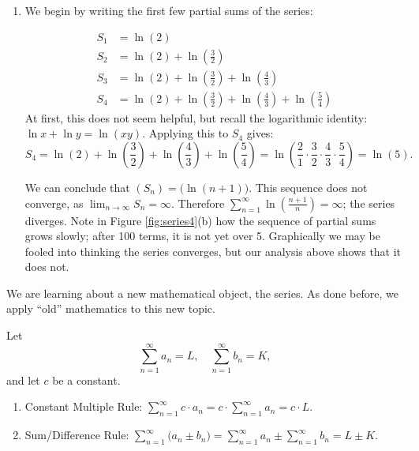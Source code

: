 \documentclass{ximera}
\begin{document}
\begin{example}
\begin{enumerate}
\item We begin by writing the first few partial sums of the series:

\begin{align*}
S_1 &= \ln\left(2\right) \\
S_2 &= \ln\left(2\right)+\ln\left(\frac32\right) \\
S_3 &= \ln\left(2\right)+\ln\left(\frac32\right)+\ln\left(\frac43\right) \\
S_4 &= \ln\left(2\right)+\ln\left(\frac32\right)+\ln\left(\frac43\right)+\ln\left(\frac54\right) 
\end{align*}
At first, this does not seem helpful, but recall the logarithmic identity: $\ln x+\ln y = \ln (xy).$ Applying this to $S_4$ gives:
$$S_4 = \ln\left(2\right)+\ln\left(\frac32\right)+\ln\left(\frac43\right)+\ln\left(\frac54\right) = \ln\left(\frac21\cdot\frac32\cdot\frac43\cdot\frac54\right) = \ln\left(5\right).$$

We can conclude that $(S_n) = \big(\ln (n+1)\big)$. This sequence does
not converge, as $\lim_{n\to\infty}S_n=\infty$. Therefore
$\sum_{n=1}^\infty \ln\left(\frac{n+1}{n}\right)=\infty$; the series
diverges. Note in Figure \ref{fig:series4}(b) how the sequence of
partial sums grows slowly; after 100 terms, it is not yet over
5. Graphically we may be fooled into thinking the series converges,
but our analysis above shows that it does not.
\end{enumerate}
\end{example}

We are learning about a new mathematical object, the series. As done
before, we apply ``old'' mathematics to this new topic.

\begin{theorem}
  Let
  \[
  \sum_{n=1}^\infty a_n = L,\quad \sum_{n=1}^\infty b_n =K, 
  \]
  and let $c$ be a constant.
\begin{enumerate}
\item Constant Multiple Rule: $\sum_{n=1}^\infty c\cdot a_n =
  c\cdot\sum_{n=1}^\infty a_n = c\cdot L.$
\item Sum/Difference Rule: $\sum_{n=1}^\infty \big(a_n\pm b_n\big) =
  \sum_{n=1}^\infty a_n \pm \sum_{n=1}^\infty b_n = L \pm K.$
\end{enumerate} 
\end{theorem}
\end{document}
